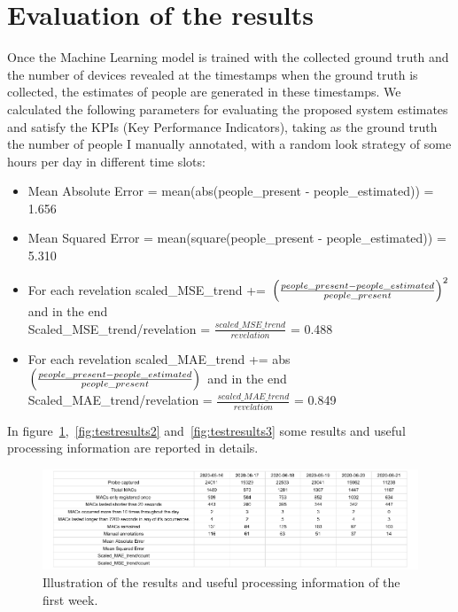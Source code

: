 \section{Evaluation of the results}
\label{sec:evalres}
\vspace{0.2 cm} 

Once the Machine Learning model is trained with the collected ground truth and the number of devices revealed at the timestamps when the ground truth is collected, the estimates of people are generated in these timestamps. We calculated the following parameters for evaluating the proposed system estimates and satisfy the KPIs (Key Performance Indicators), taking as the ground truth the number of people I manually annotated, with a random look strategy of some hours per day in different time slots:
\begin{itemize}
  \item Mean Absolute Error = mean(abs(people\_present - people\_estimated)) = 1.656
  \item Mean Squared Error = mean(square(people\_present - people\_estimated)) = 5.310
  \item For each revelation scaled\_MSE\_trend += $\Bigl(\frac{people\_present - people\_estimated}{people\_present} \Bigr)^{2}$ and in the end\\Scaled\_MSE\_trend/revelation = $\frac{scaled\_MSE\_trend}{revelation}$ = 0.488
  \item For each revelation scaled\_MAE\_trend += abs$\Bigl(\frac{people\_present - people\_estimated}{people\_present} \Bigr)$ and in the end\\Scaled\_MAE\_trend/revelation = $\frac{scaled\_MAE\_trend}{revelation}$ = 0.849
\end{itemize}

In figure~\ref{fig:testresults1},~\ref{fig:testresults2} and~\ref{fig:testresults3} some results and useful processing information are reported in details.

\begin{figure}[h]
\centering 
\includegraphics[width=1\textwidth]{images/testresults1} 
\caption{Illustration of the results and useful processing information of the first week.}
\label{fig:testresults1}
\end{figure}

